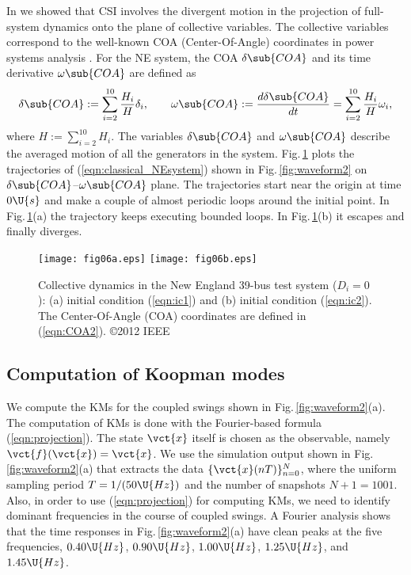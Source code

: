 \documentclass[a4paper,10pt]{article}
\begin{document}
%
In \cite{Susuki_JNLS09} we showed that CSI involves the divergent motion in the projection of full-system dynamics onto the plane of collective variables.  
The collective variables correspond to the well-known COA (Center-Of-Angle) coordinates in power systems analysis \cite{Athay_IEEE-T-PAS98,Pai:1989}.  
For the NE system, the COA $\delta\sub{COA}$ and its time derivative $\omega\sub{COA}$ are defined as  
\begin{eqnarray}
\delta\sub{COA}:=\sum_{i=2}^{10}\frac{H_i}{H}\delta_i,\makebox[2em]{}
\omega\sub{COA}:=\frac{d\delta\sub{COA}}{dt}=\sum_{i=2}^{10}\frac{H_i}{H}\omega_i,
\label{eqn:COA2}
\end{eqnarray}
where $H:=\sum^{10}_{i=2} H_i$.  
The variables $\delta\sub{COA}$ and $\omega\sub{COA}$ describe the averaged motion of all the generators in the system.  
Fig.\,\ref{fig:COA2} plots the trajectories of (\ref{eqn:classical_NEsystem}) shown in Fig.\,\ref{fig:waveform2} on $\delta\sub{COA}$--$\omega\sub{COA}$ plane.  
The trajectories start near the origin at time $0\U{s}$ and make a couple of almost periodic loops around the initial point.  
In Fig.\,\ref{fig:COA2}(a) the trajectory keeps executing bounded loops.  
In Fig.\,\ref{fig:COA2}(b) it escapes and finally diverges.  

%
\begin{figure}[t] %
\begin{center}
\texttt{[image: fig06a.eps]} %
\hspace*{4mm}
\texttt{[image: fig06b.eps]}
\caption{%
Collective dynamics in the New England 39-bus test system ($D_i=0$): (a) initial condition (\ref{eqn:ic1}) and (b) initial condition (\ref{eqn:ic2}).  
The Center-Of-Angle (COA) coordinates are defined in (\ref{eqn:COA2}).
\copyright 2012 IEEE
}%
\label{fig:COA2}
\end{center}
\end{figure}


\subsection{Computation of Koopman modes}
\label{subsec:precursor-KMD}

We compute the KMs for the coupled swings shown in Fig.\,\ref{fig:waveform2}(a).  
The computation of KMs is done with the Fourier-based formula (\ref{eqn:projection}).  
The state $\vct{x}$ itself is chosen as the observable, namely $\vct{f}(\vct{x})=\vct{x}$.  
We use the simulation output shown in Fig.\,\ref{fig:waveform2}(a) that extracts the data $\{\vct{x}(nT)\}_{n=0}^{N}$, where the uniform sampling period $T=1/(50\U{Hz})$ and the number of snapshots $N+1=1001$.  
Also, in order to use (\ref{eqn:projection}) for computing KMs, we need to identify dominant frequencies in the course of coupled swings.  
A Fourier analysis shows that the time responses in Fig.\,\ref{fig:waveform2}(a) have clean peaks at the five frequencies, $0.40\U{Hz}$, $0.90\U{Hz}$, $1.00\U{Hz}$, $1.25\U{Hz}$, and $1.45\U{Hz}$.  
\end{document}
